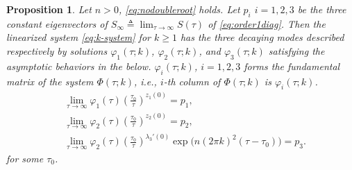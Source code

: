 \documentclass[a4paper,11pt]{article}
\newtheorem{proposition}{Proposition}[section]
\theoremstyle{remark}
\begin{document}
\begin{proposition} \label{prop:fund}
 Let $n>0$, \eqref{eq:nodoubleroot} holds. Let $p_i$ $i=1,2,3$ be the three constant eigenvectors of $\displaystyle S_\infty \triangleq  \lim_{\tau \rightarrow \infty} S(\tau)$ of \eqref{eq:order1diag}. Then the linearized system \eqref{eq:k-system} for $k\ge1$ has the three decaying modes described respectively by solutions $\varphi_1(\tau;k)$, $\varphi_2(\tau;k)$, and $\varphi_3(\tau;k)$ satisfying the asymptotic behaviors in the below. $\varphi_i(\tau;k)$, $i=1,2,3$ forms the fundamental matrix of the system $\Phi(\tau;k)$, i.e., $i$-th column of $\Phi(\tau;k)$ is $\varphi_{i}(\tau;k)$.
 \begin{align*}
 &\lim_{\tau \rightarrow \infty} \varphi_1(\tau)\left(\frac{\tau_0}{\tau}\right)^{z_1(0)} = p_1, \\
 &\lim_{\tau \rightarrow \infty} \varphi_2(\tau)\left(\frac{\tau_0}{\tau}\right)^{z_2(0)} = p_2, \\
 &\lim_{\tau \rightarrow \infty} \varphi_2(\tau)\left(\frac{\tau_0}{\tau}\right)^{\lambda_3'(0)}\exp\Big(n(2\pi k)^2(\tau-\tau_0)\Big) = p_3.
 \end{align*}
 for some $\tau_0$.
\end{proposition}
\end{document}
